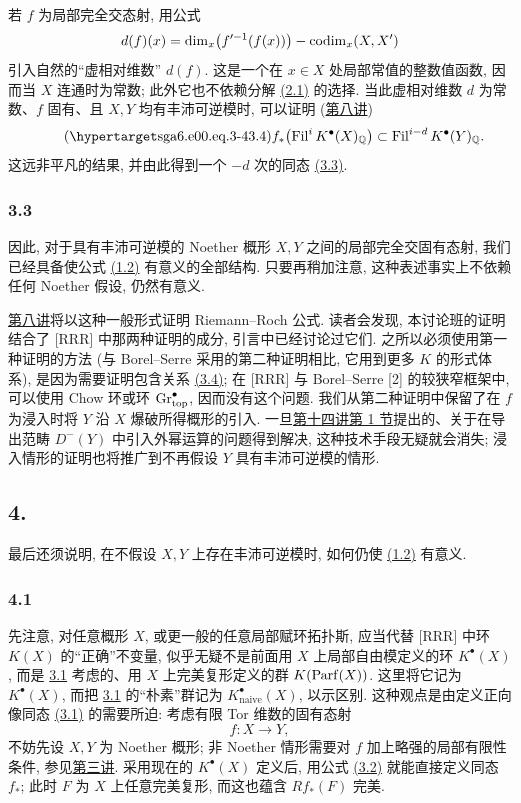 若 $f$ 为局部完全交态射, 用公式
\[
d(f)(x)=\dim_x\bigl(f'^{-1}(f(x))\bigr)-\operatorname{codim}_x(X,X')
\]
引入自然的“虚相对维数” $d(f)$. 这是一个在 $x\in X$ 处局部常值的整数值函数, 因而当 $X$ 连通时为常数; 此外它也不依赖分解 \hyperlink{sga6.e00.eq.2-1}{(2.1)} 的选择. 当此虚相对维数 $d$ 为常数、$f$ 固有、且 $X,Y$ 均有丰沛可逆模时, 可以证明 (\hyperlink{sga6.e08.expose}{第八讲})
\begin{equation}\tag{\sgaStableTargetInline{sga6.e00.eq.3-4}3.4}
f_*\bigl(\Fil^i K^\bullet(X)_{\mathbb Q}\bigr)\subset \Fil^{i-d}K^\bullet(Y)_{\mathbb Q}.
\end{equation}
这远非平凡的结果, 并由此得到一个 $-d$ 次的同态 \hyperlink{sga6.e00.eq.3-3}{(3.3)}.

\subsubsection*{3.3}
因此, 对于具有丰沛可逆模的 Noether 概形 $X,Y$ 之间的局部完全交固有态射, 我们已经具备使公式 \hyperlink{sga6.e00.eq.1-2}{(1.2)} 有意义的全部结构. 只要再稍加注意, 这种表述事实上不依赖任何 Noether 假设, 仍然有意义.

\hyperlink{sga6.e08.expose}{第八讲}将以这种一般形式证明 Riemann--Roch 公式. 读者会发现, 本讨论班的证明结合了 [RRR] 中那两种证明的成分, 引言中已经讨论过它们. 之所以必须使用第一种证明的方法 (与 Borel--Serre 采用的第二种证明相比, 它用到更多 $K$ 的形式体系), 是因为需要证明包含关系 \hyperlink{sga6.e00.eq.3-4}{(3.4)}; 在 [RRR] 与 Borel--Serre [2] 的较狭窄框架中, 可以使用 Chow 环或环 $\operatorname{Gr}^\bullet_{\mathrm{top}}$, 因而没有这个问题. 我们从第二种证明中保留了在 $f$ 为浸入时将 $Y$ 沿 $X$ 爆破所得概形的引入. 一旦\hyperlink{sga6.e14.sec.1}{第十四讲第 1 节}提出的、关于在导出范畴 $D^-(Y)$ 中引入外幂运算的问题得到解决, 这种技术手段无疑就会消失; 浸入情形的证明也将推广到不再假设 $Y$ 具有丰沛可逆模的情形.

\subsection*{4.}
最后还须说明, 在不假设 $X,Y$ 上存在丰沛可逆模时, 如何仍使 \hyperlink{sga6.e00.eq.1-2}{(1.2)} 有意义.

\subsubsection*{4.1}
先注意, 对任意概形 $X$, 或更一般的任意局部赋环拓扑斯, 应当代替 [RRR] 中环 $K(X)$ 的“正确”不变量, 似乎无疑不是前面用 $X$ 上局部自由模定义的环 $K^\bullet(X)$, 而是 \hyperlink{sga6.e00.sec.3.1}{3.1} 考虑的、用 $X$ 上完美复形定义的群 $K(\operatorname{Parf}(X))$. 这里将它记为 $K^\bullet(X)$, 而把 \hyperlink{sga6.e00.sec.3.1}{3.1} 的“朴素”群记为 $K^\bullet_{\mathrm{naive}}(X)$, 以示区别. 这种观点是由定义正向像同态 \hyperlink{sga6.e00.eq.3-1}{(3.1)} 的需要所迫: 考虑有限 Tor 维数的固有态射
\[
f:X\longrightarrow Y,
\]
不妨先设 $X,Y$ 为 Noether 概形; 非 Noether 情形需要对 $f$ 加上略强的局部有限性条件, 参见\hyperlink{sga6.e03.expose}{第三讲}. 采用现在的 $K^\bullet(X)$ 定义后, 用公式 \hyperlink{sga6.e00.eq.3-2}{(3.2)} 就能直接定义同态 $f_*$; 此时 $F$ 为 $X$ 上任意完美复形, 而这也蕴含 $Rf_*(F)$ 完美.

